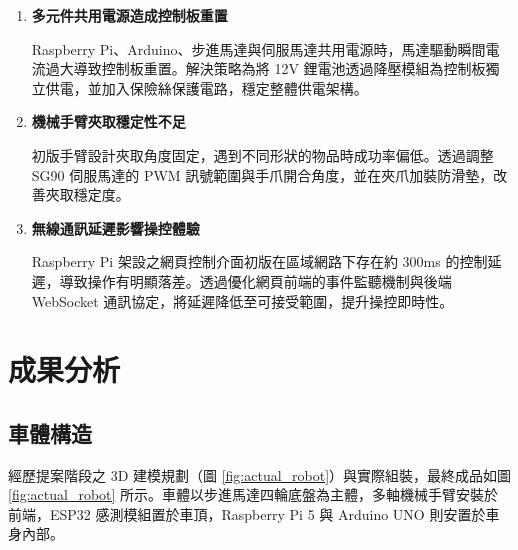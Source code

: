\documentclass[12pt]{article}
\begin{document}
\begin{enumerate}
  \setlength{\itemsep}{0.6em}

  \item \textbf{多元件共用電源造成控制板重置}

  Raspberry Pi、Arduino、步進馬達與伺服馬達共用電源時，馬達驅動瞬間電流過大導致控制板重置。解決策略為將 12V 鋰電池透過降壓模組為控制板獨立供電，並加入保險絲保護電路，穩定整體供電架構。

  \item \textbf{機械手臂夾取穩定性不足}

  初版手臂設計夾取角度固定，遇到不同形狀的物品時成功率偏低。透過調整 SG90 伺服馬達的 PWM 訊號範圍與手爪開合角度，並在夾爪加裝防滑墊，改善夾取穩定度。

  \item \textbf{無線通訊延遲影響操控體驗}

  Raspberry Pi 架設之網頁控制介面初版在區域網路下存在約 300ms 的控制延遲，導致操作有明顯落差。透過優化網頁前端的事件監聽機制與後端 WebSocket 通訊協定，將延遲降低至可接受範圍，提升操控即時性。

\end{enumerate}

\section{成果分析}

\subsection{車體構造}

經歷提案階段之 3D 建模規劃（圖 \ref{fig:actual_robot}）與實際組裝，最終成品如圖 \ref{fig:actual_robot} 所示。車體以步進馬達四輪底盤為主體，多軸機械手臂安裝於前端，ESP32 感測模組置於車頂，Raspberry Pi 5 與 Arduino UNO 則安置於車身內部。
\end{document}
